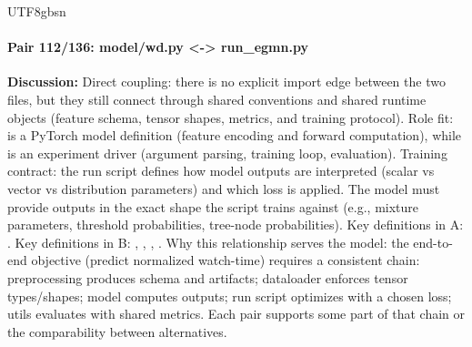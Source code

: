 \documentclass[11pt]{article}
\begin{document}
\begin{CJK*}{UTF8}{gbsn}
\paragraph{Pair 112/136: model/wd.py <-> run\_egmn.py}
\textbf{Discussion:} Direct coupling: there is no explicit import edge between the two files, but they still connect through shared conventions and shared runtime objects (feature schema, tensor shapes, metrics, and training protocol). Role fit: \texttt{} is a PyTorch model definition (feature encoding and forward computation), while \texttt{} is an experiment driver (argument parsing, training loop, evaluation). Training contract: the run script defines how model outputs are interpreted (scalar vs vector vs distribution parameters) and which loss is applied. The model must provide outputs in the exact shape the script trains against (e.g., mixture parameters, threshold probabilities, tree-node probabilities). Key definitions in A: \texttt{}. Key definitions in B: \texttt{}, \texttt{}, \texttt{}, \texttt{}. Why this relationship serves the model: the end-to-end objective (predict normalized watch-time) requires a consistent chain: preprocessing produces schema and artifacts; dataloader enforces tensor types/shapes; model computes outputs; run script optimizes with a chosen loss; utils evaluates with shared metrics. Each pair supports some part of that chain or the comparability between alternatives.


\end{CJK*}
\end{document}
